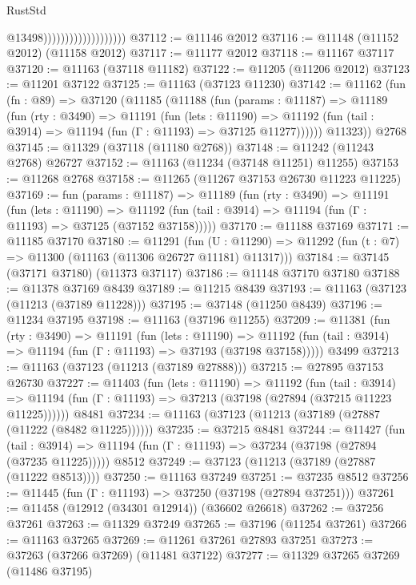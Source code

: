 \begin{lexlean}{RustStd}
\begin{coremodule}
                                          @13498)))))))))))))))))))
@37112 := @11146 @2012
@37116 := @11148 (@11152 @2012) (@11158 @2012)
@37117 := @11177 @2012
@37118 := @11167 @37117
@37120 := @11163 (@37118 @11182)
@37122 := @11205 (@11206 @2012)
@37123 := @11201 @37122
@37125 := @11163 (@37123 @11230)
@37142 := @11162
    (fun (fn : @89) =>
    @37120
      (@11185
        (@11188
          (fun (params : @11187) =>
          @11189
            (fun (rty : @3490) =>
            @11191
              (fun (lets : @11190) =>
              @11192 (fun (tail : @3914) => @11194 (fun (Γ : @11193) => @37125 @11277))))))
        @11323))
    @2768
@37145 := @11329 (@37118 (@11180 @2768))
@37148 := @11242 (@11243 @2768) @26727
@37152 := @11163 (@11234 (@37148 @11251) @11255)
@37153 := @11268 @2768
@37158 := @11265 (@11267 @37153 @26730 @11223 @11225)
@37169 := fun (params : @11187) =>
  @11189
    (fun (rty : @3490) =>
    @11191
      (fun (lets : @11190) =>
      @11192 (fun (tail : @3914) => @11194 (fun (Γ : @11193) => @37125 (@37152 @37158)))))
@37170 := @11188 @37169
@37171 := @11185 @37170
@37180 := @11291
    (fun (U : @11290) => @11292 (fun (t : @7) => @11300 (@11163 (@11306 @26727 @11181) @11317)))
@37184 := @37145 (@37171 @37180) (@11373 @37117)
@37186 := @11148 @37170 @37180
@37188 := @11378 @37169 @8439
@37189 := @11215 @8439
@37193 := @11163 (@37123 (@11213 (@37189 @11228)))
@37195 := @37148 (@11250 @8439)
@37196 := @11234 @37195
@37198 := @11163 (@37196 @11255)
@37209 := @11381
    (fun (rty : @3490) =>
    @11191
      (fun (lets : @11190) =>
      @11192 (fun (tail : @3914) => @11194 (fun (Γ : @11193) => @37193 (@37198 @37158)))))
    @3499
@37213 := @11163 (@37123 (@11213 (@37189 @27888)))
@37215 := @27895 @37153 @26730
@37227 := @11403
    (fun (lets : @11190) =>
    @11192
      (fun (tail : @3914) =>
      @11194 (fun (Γ : @11193) => @37213 (@37198 (@27894 (@37215 @11223 @11225))))))
    @8481
@37234 := @11163 (@37123 (@11213 (@37189 (@27887 (@11222 (@8482 @11225))))))
@37235 := @37215 @8481
@37244 := @11427
    (fun (tail : @3914) => @11194 (fun (Γ : @11193) => @37234 (@37198 (@27894 (@37235 @11225)))))
    @8512
@37249 := @37123 (@11213 (@37189 (@27887 (@11222 @8513))))
@37250 := @11163 @37249
@37251 := @37235 @8512
@37256 := @11445 (fun (Γ : @11193) => @37250 (@37198 (@27894 @37251)))
@37261 := @11458 (@12912 (@34301 @12914)) (@36602 @26618)
@37262 := @37256 @37261
@37263 := @11329 @37249
@37265 := @37196 (@11254 @37261)
@37266 := @11163 @37265
@37269 := @11261 @37261 @27893 @37251
@37273 := @37263 (@37266 @37269) (@11481 @37122)
@37277 := @11329 @37265 @37269 (@11486 @37195)

\end{coremodule}
\end{lexlean}
